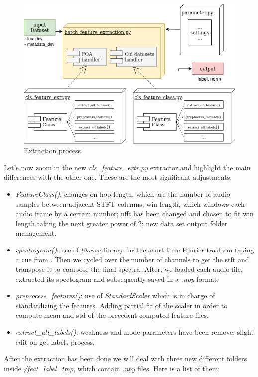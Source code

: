\documentclass[11pt]{article}
\begin{document}
\begin{figure}[h!]
	\centering
	\includegraphics[width=12.5cm]{img/extraction.png}
	\caption{Extraction process.}
	\label{fig:extraction}
\end{figure}

\noindent
Let's now zoom in the new \textit{cls\_feature\_extr.py} extractor and highlight the main differences with the other one. These are the most significant adjustments:

\begin{itemize}
	\item \textit{FeatureClass()}: changes on hop length, which are the number of audio samples between adjacent STFT columns; win length, which windows each audio frame by a certain number; nfft has been changed and chosen to fit win length taking the next greater power of 2; new data set output folder management.
	\item \textit{spectrogram()}: use of \textit{librosa} library for the short-time Fourier trasform taking a cue from \cite{git}. Then we cycled over the number of channels to get the stft and transpose it to compose the final spectra. After, we loaded each audio file, extracted its spectogram and subsequently saved in a \textit{.npy} format.
	\item \textit{preprocess\_features()}: use of \textit{StandardScaler} which is in charge of standardizing the features. Adding partial fit of the scaler in order to compute mean and std of the precedent computed feature files.
	\item \textit{extract\_all\_labels()}: weakness and mode parameters have been remove; slight edit on get labels process.
\end{itemize}

\noindent
After the extraction has been done we will deal with three new different folders inside \textit{/feat\_label\_tmp}, which contain \textit{.npy} files. Here is a list of them: 
\end{document}
